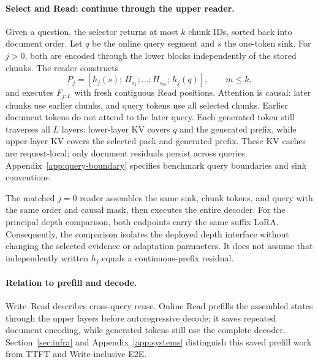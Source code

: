 \paragraph{Select and Read: continue through the upper reader.}
Given a question, the selector returns at most $k$ chunk IDs, sorted back into document order. Let $q$ be the online query segment and $s$ the one-token sink. For $j>0$, both are encoded through the lower blocks independently of the stored chunks. The reader constructs
\begin{equation}
 P_j=[h_j(s);\,H_{s_1};\ldots;H_{s_m};\,h_j(q)],
 \qquad m\leq k,
 \label{eq:pack}
\end{equation}
and executes $F_{j:L}$ with fresh contiguous Read positions. Attention is causal: later chunks use earlier chunks, and query tokens use all selected chunks. Earlier document tokens do not attend to the later query. Each generated token still traverses all $L$ layers: lower-layer KV covers $q$ and the generated prefix, while upper-layer KV covers the selected pack and generated prefix. These KV caches are request-local; only document residuals persist across queries. Appendix~\ref{app:query-boundary} specifies benchmark query boundaries and sink conventions.

The matched $j=0$ reader assembles the same sink, chunk tokens, and query with the same order and causal mask, then executes the entire decoder. For the principal depth comparison, both endpoints carry the same suffix LoRA. Consequently, the comparison isolates the deployed depth interface without changing the selected evidence or adaptation parameters. It does not assume that independently written $h_j$ equals a continuous-prefix residual.

\paragraph{Relation to prefill and decode.}
Write--Read describes cross-query reuse. Online Read prefills the assembled states through the upper layers before autoregressive decode; it saves repeated document encoding, while generated tokens still use the complete decoder. Section~\ref{sec:infra} and Appendix~\ref{app:systems} distinguish this saved prefill work from TTFT and Write-inclusive E2E.

